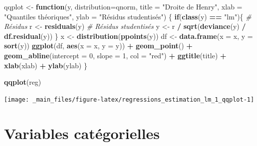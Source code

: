 \documentclass[
  11pt,
]{book}
\newenvironment{Shaded}{\begin{snugshade}}{\end{snugshade}}
\newcommand{\CommentTok}[1]{\textcolor[rgb]{0.56,0.35,0.01}{\textit{#1}}}
\newcommand{\ControlFlowTok}[1]{\textcolor[rgb]{0.13,0.29,0.53}{\textbf{#1}}}
\newcommand{\DataTypeTok}[1]{\textcolor[rgb]{0.13,0.29,0.53}{#1}}
\newcommand{\DecValTok}[1]{\textcolor[rgb]{0.00,0.00,0.81}{#1}}
\newcommand{\KeywordTok}[1]{\textcolor[rgb]{0.13,0.29,0.53}{\textbf{#1}}}
\newcommand{\NormalTok}[1]{#1}
\newcommand{\OperatorTok}[1]{\textcolor[rgb]{0.81,0.36,0.00}{\textbf{#1}}}
\newcommand{\StringTok}[1]{\textcolor[rgb]{0.31,0.60,0.02}{#1}}
\numberwithin{equation}{section}
\numberwithin{countremarque}{section}
\begin{document}
\begin{Shaded}
\begin{Highlighting}[]
\NormalTok{qqplot \textless{}{-}}\StringTok{ }\ControlFlowTok{function}\NormalTok{(y, }\DataTypeTok{distribution=}\NormalTok{qnorm, }\DataTypeTok{title =} \StringTok{"Droite de Henry"}\NormalTok{,}
                   \DataTypeTok{xlab =} \StringTok{"Quantiles théoriques"}\NormalTok{,}
                   \DataTypeTok{ylab =} \StringTok{"Résidus studentisés"}\NormalTok{) \{}
  \ControlFlowTok{if}\NormalTok{(}\KeywordTok{class}\NormalTok{(y) }\OperatorTok{==}\StringTok{ "lm"}\NormalTok{)\{}
    \CommentTok{\# Résidus}
\NormalTok{    r \textless{}{-}}\StringTok{ }\KeywordTok{residuals}\NormalTok{(y)}
    \CommentTok{\# Résidus studentisés}
\NormalTok{    y \textless{}{-}}\StringTok{ }\NormalTok{r }\OperatorTok{/}\StringTok{ }\KeywordTok{sqrt}\NormalTok{(}\KeywordTok{deviance}\NormalTok{(y) }\OperatorTok{/}\StringTok{ }\KeywordTok{df.residual}\NormalTok{(y))}
\NormalTok{  \}}
\NormalTok{  x \textless{}{-}}\StringTok{ }\KeywordTok{distribution}\NormalTok{(}\KeywordTok{ppoints}\NormalTok{(y))}
\NormalTok{  df \textless{}{-}}\StringTok{ }\KeywordTok{data.frame}\NormalTok{(}\DataTypeTok{x =}\NormalTok{ x, }\DataTypeTok{y =} \KeywordTok{sort}\NormalTok{(y))}
  \KeywordTok{ggplot}\NormalTok{(df, }\KeywordTok{aes}\NormalTok{(}\DataTypeTok{x =}\NormalTok{ x, }\DataTypeTok{y =}\NormalTok{ y)) }\OperatorTok{+}
\StringTok{    }\KeywordTok{geom\_point}\NormalTok{() }\OperatorTok{+}
\StringTok{    }\KeywordTok{geom\_abline}\NormalTok{(}\DataTypeTok{intercept =} \DecValTok{0}\NormalTok{, }\DataTypeTok{slope =} \DecValTok{1}\NormalTok{, }\DataTypeTok{col =} \StringTok{"red"}\NormalTok{) }\OperatorTok{+}
\StringTok{    }\KeywordTok{ggtitle}\NormalTok{(title) }\OperatorTok{+}
\StringTok{    }\KeywordTok{xlab}\NormalTok{(xlab) }\OperatorTok{+}\StringTok{ }\KeywordTok{ylab}\NormalTok{(ylab)}
\NormalTok{\}}

\KeywordTok{qqplot}\NormalTok{(reg)}
\end{Highlighting}
\end{Shaded}

\begin{center}\texttt{[image: \_main\_files/figure-latex/regressions\_estimation\_lm\_1\_qqplot-1]} \end{center}

\hypertarget{regressions_facteurs}{%
\section{Variables catégorielles}\label{regressions_facteurs}}
\end{document}
